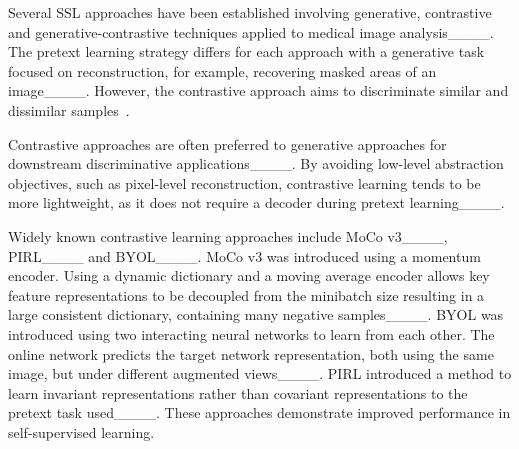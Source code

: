 Several SSL approaches have been established involving generative, contrastive and generative-contrastive techniques applied to medical image analysis____. The pretext learning strategy differs for each approach with a generative task focused on reconstruction, for example, recovering masked areas of an image____. However, the contrastive approach aims to discriminate similar and dissimilar samples~\cite {misra_self-supervised_2020}. 

Contrastive approaches are often preferred to generative approaches for downstream discriminative applications____. By avoiding low-level abstraction objectives, such as pixel-level reconstruction, contrastive learning tends to be more lightweight, as it does not require a decoder during pretext learning____. 

Widely known contrastive learning approaches include MoCo v3____, PIRL____ and BYOL____. MoCo v3 was introduced using a momentum encoder. Using a dynamic dictionary and a moving average encoder allows key feature representations to be decoupled from the minibatch size resulting in a large consistent dictionary, containing many negative samples____. BYOL was introduced using two interacting neural networks to learn from each other. The online network predicts the target network representation, both using the same image, but under different augmented views____. PIRL introduced a
method to learn invariant representations rather than covariant representations to the pretext task used____. These approaches demonstrate improved performance in self-supervised learning. 


